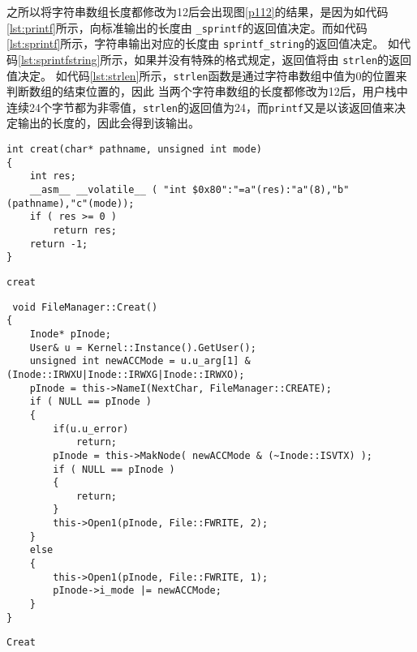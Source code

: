 之所以将字符串数组长度都修改为12后会出现图\ref{p112}的结果，是因为如代码 \ref{lst:printf}所示，向标准输出的长度由 \texttt{\_sprintf}的返回值决定。而如代码\ref{lst:sprintf}所示，字符串输出对应的长度由 \texttt{sprintf\_string}的返回值决定。
如代码\ref{lst:sprintfstring}所示，如果并没有特殊的格式规定，返回值将由 \texttt{strlen}的返回值决定。
如代码\ref{lst:strlen}所示，\texttt{strlen}函数是通过字符串数组中值为0的位置来判断数组的结束位置的，因此
当两个字符串数组的长度都修改为12后，用户栈中连续24个字节都为非零值，\texttt{strlen}的返回值为24，而\texttt{printf}又是以该返回值来决定输出的长度的，因此会得到该输出。

\begin{listing}[htbp]
    \begin{verbatim}
int creat(char* pathname, unsigned int mode)
{
    int res;
    __asm__ __volatile__ ( "int $0x80":"=a"(res):"a"(8),"b"(pathname),"c"(mode));
    if ( res >= 0 )
        return res;
    return -1;
}
    \end{verbatim}
    \caption{\texttt{creat}}\label{lst:creat}
\end{listing}

\begin{listing}[htbp]
    \begin{verbatim}
 void FileManager::Creat()
{
    Inode* pInode;
    User& u = Kernel::Instance().GetUser();
    unsigned int newACCMode = u.u_arg[1] & (Inode::IRWXU|Inode::IRWXG|Inode::IRWXO);
    pInode = this->NameI(NextChar, FileManager::CREATE);
    if ( NULL == pInode )
    {
        if(u.u_error)
            return;
        pInode = this->MakNode( newACCMode & (~Inode::ISVTX) );
        if ( NULL == pInode )
        {
            return;
        }
        this->Open1(pInode, File::FWRITE, 2);
    }
    else
    {
        this->Open1(pInode, File::FWRITE, 1);
        pInode->i_mode |= newACCMode;
    }
}
    \end{verbatim}
    \caption{\texttt{Creat}}\label{lst:Creat}
\end{listing}

